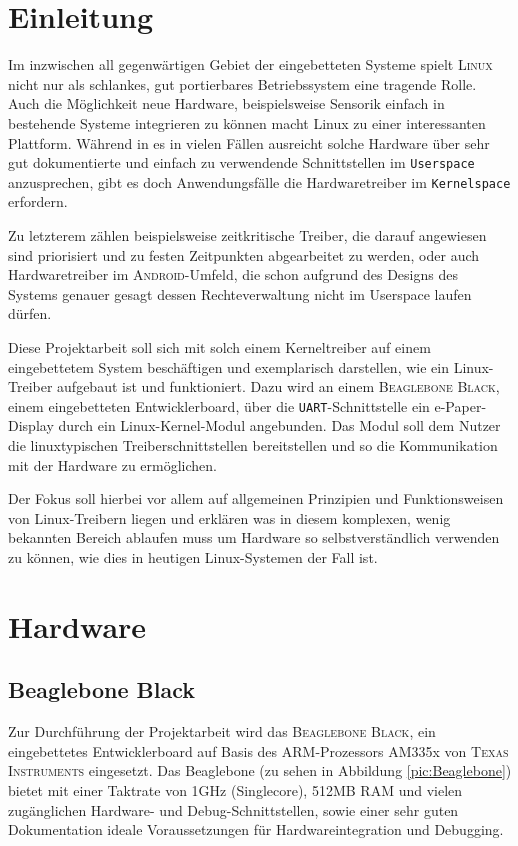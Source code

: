 
\chapter{Einleitung}
Im inzwischen all gegenwärtigen Gebiet der eingebetteten Systeme spielt \textsc{Linux} nicht nur als schlankes, gut portierbares Betriebssystem eine tragende Rolle. Auch die Möglichkeit neue Hardware, beispielsweise Sensorik einfach in bestehende Systeme integrieren zu können macht Linux zu einer interessanten Plattform. 
Während in es in vielen Fällen ausreicht solche Hardware über sehr gut dokumentierte und einfach zu verwendende Schnittstellen im \texttt{Userspace} anzusprechen, gibt es doch Anwendungsfälle die Hardwaretreiber im \texttt{Kernelspace} erfordern. 

Zu letzterem zählen beispielsweise zeitkritische Treiber, die darauf angewiesen sind priorisiert und zu festen Zeitpunkten abgearbeitet zu werden, oder auch Hardwaretreiber im \textsc{Android}-Umfeld, die schon aufgrund des Designs des Systems genauer gesagt dessen Rechteverwaltung nicht im Userspace laufen dürfen. \newline

Diese Projektarbeit soll sich mit solch einem Kerneltreiber auf einem eingebettetem System beschäftigen und exemplarisch darstellen, wie ein Linux-Treiber aufgebaut ist und funktioniert. Dazu wird an einem \textsc{Beaglebone Black}, einem eingebetteten Entwicklerboard, über die \texttt{UART}-Schnittstelle ein e-Paper-Display durch ein Linux-Kernel-Modul angebunden. Das Modul soll dem Nutzer die linuxtypischen Treiberschnittstellen bereitstellen und so die Kommunikation mit der Hardware zu ermöglichen.

Der Fokus soll hierbei vor allem auf allgemeinen Prinzipien und Funktionsweisen von Linux-Treibern liegen und erklären was in diesem komplexen, wenig bekannten Bereich ablaufen muss um Hardware so selbstverständlich verwenden zu können, wie dies in heutigen Linux-Systemen der Fall ist. 

\chapter{Hardware}

\section{Beaglebone Black}
Zur Durchführung der Projektarbeit wird das \textsc{Beaglebone Black}, ein eingebettetes Entwicklerboard auf Basis des ARM-Prozessors AM335x von \textsc{Texas Instruments} eingesetzt. Das Beaglebone (zu sehen in Abbildung \ref{pic:Beaglebone}) bietet mit einer Taktrate von 1GHz (Singlecore), 512MB RAM und vielen zugänglichen Hardware- und Debug-Schnittstellen, sowie einer sehr guten Dokumentation ideale Voraussetzungen für Hardwareintegration und Debugging. 

